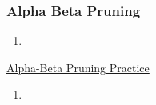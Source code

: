 \subsubsection{Alpha Beta Pruning}
\begin{process}
    \begin{enumerate}
        \item 
    \end{enumerate}
\end{process}

\begin{example} \href{https://pascscha.ch/info2/abTreePractice/}{Alpha-Beta Pruning Practice}
    \begin{enumerate}
        \item 
    \end{enumerate}
\end{example}
\newpage

